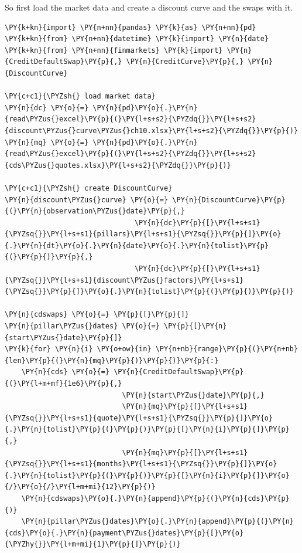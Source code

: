 So first load the market data and create a discount curve and the swaps with it.
\begin{tcolorbox}[breakable, size=fbox, boxrule=1pt, pad at break*=1mm,colback=cellbackground, colframe=cellborder]
\begin{Verbatim}[commandchars=\\\{\}]
\PY{k+kn}{import} \PY{n+nn}{pandas} \PY{k}{as} \PY{n+nn}{pd}
\PY{k+kn}{from} \PY{n+nn}{datetime} \PY{k}{import} \PY{n}{date}
\PY{k+kn}{from} \PY{n+nn}{finmarkets} \PY{k}{import} \PY{n}{CreditDefaultSwap}\PY{p}{,} \PY{n}{CreditCurve}\PY{p}{,} \PY{n}{DiscountCurve}
	
\PY{c+c1}{\PYZsh{} load market data}
\PY{n}{dc} \PY{o}{=} \PY{n}{pd}\PY{o}{.}\PY{n}{read\PYZus{}excel}\PY{p}{(}\PY{l+s+s2}{\PYZdq{}}\PY{l+s+s2}{discount\PYZus{}curve\PYZus{}ch10.xlsx}\PY{l+s+s2}{\PYZdq{}}\PY{p}{)}
\PY{n}{mq} \PY{o}{=} \PY{n}{pd}\PY{o}{.}\PY{n}{read\PYZus{}excel}\PY{p}{(}\PY{l+s+s2}{\PYZdq{}}\PY{l+s+s2}{cds\PYZus{}quotes.xlsx}\PY{l+s+s2}{\PYZdq{}}\PY{p}{)}
	
\PY{c+c1}{\PYZsh{} create DiscountCurve}
\PY{n}{discount\PYZus{}curve} \PY{o}{=} \PY{n}{DiscountCurve}\PY{p}{(}\PY{n}{observation\PYZus{}date}\PY{p}{,}
                               \PY{n}{dc}\PY{p}{[}\PY{l+s+s1}{\PYZsq{}}\PY{l+s+s1}{pillars}\PY{l+s+s1}{\PYZsq{}}\PY{p}{]}\PY{o}{.}\PY{n}{dt}\PY{o}{.}\PY{n}{date}\PY{o}{.}\PY{n}{tolist}\PY{p}{(}\PY{p}{)}\PY{p}{,}
                               \PY{n}{dc}\PY{p}{[}\PY{l+s+s1}{\PYZsq{}}\PY{l+s+s1}{discount\PYZus{}factors}\PY{l+s+s1}{\PYZsq{}}\PY{p}{]}\PY{o}{.}\PY{n}{tolist}\PY{p}{(}\PY{p}{)}\PY{p}{)}
	
\PY{n}{cdswaps} \PY{o}{=} \PY{p}{[}\PY{p}{]}
\PY{n}{pillar\PYZus{}dates} \PY{o}{=} \PY{p}{[}\PY{n}{start\PYZus{}date}\PY{p}{]}
\PY{k}{for} \PY{n}{i} \PY{o+ow}{in} \PY{n+nb}{range}\PY{p}{(}\PY{n+nb}{len}\PY{p}{(}\PY{n}{mq}\PY{p}{)}\PY{p}{)}\PY{p}{:}
    \PY{n}{cds} \PY{o}{=} \PY{n}{CreditDefaultSwap}\PY{p}{(}\PY{l+m+mf}{1e6}\PY{p}{,}
                            \PY{n}{start\PYZus{}date}\PY{p}{,}
                            \PY{n}{mq}\PY{p}{[}\PY{l+s+s1}{\PYZsq{}}\PY{l+s+s1}{quote}\PY{l+s+s1}{\PYZsq{}}\PY{p}{]}\PY{o}{.}\PY{n}{tolist}\PY{p}{(}\PY{p}{)}\PY{p}{[}\PY{n}{i}\PY{p}{]}\PY{p}{,}
                            \PY{n}{mq}\PY{p}{[}\PY{l+s+s1}{\PYZsq{}}\PY{l+s+s1}{months}\PY{l+s+s1}{\PYZsq{}}\PY{p}{]}\PY{o}{.}\PY{n}{tolist}\PY{p}{(}\PY{p}{)}\PY{p}{[}\PY{n}{i}\PY{p}{]}\PY{o}{/}\PY{o}{/}\PY{l+m+mi}{12}\PY{p}{)}
    \PY{n}{cdswaps}\PY{o}{.}\PY{n}{append}\PY{p}{(}\PY{n}{cds}\PY{p}{)}
    \PY{n}{pillar\PYZus{}dates}\PY{o}{.}\PY{n}{append}\PY{p}{(}\PY{n}{cds}\PY{o}{.}\PY{n}{payment\PYZus{}dates}\PY{p}{[}\PY{o}{\PYZhy{}}\PY{l+m+mi}{1}\PY{p}{]}\PY{p}{)}
\end{Verbatim}
\end{tcolorbox}

